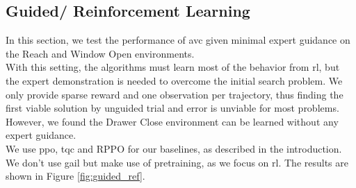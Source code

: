 \subsection{Guided/ Reinforcement Learning}
\label{sec:g_ref_ler}
In this section, we test the performance of \ac{avc} given minimal expert guidance on the Reach and Window Open environments. \\
With this setting, the algorithms must learn most of the behavior from \ac{rl}, but the expert
demonstration is needed to overcome the initial search problem. We only provide sparse reward and one observation per trajectory, thus finding the first viable solution by unguided
trial and error is unviable for most problems. However, we found the Drawer Close environment can be learned without any expert guidance.\\

We use \ac{ppo}, \ac{tqc} and RPPO for our baselines, as described in the introduction. We don't use \ac{gail} but make use of pretraining, as we focus on \ac{rl}. The results
are shown in Figure \ref{fig:guided_ref}.\\

